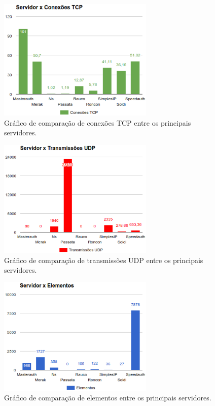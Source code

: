 \begin{figure}[h!]
 \centering
 \includegraphics[width=280px]{img/servico_tcp.eps}
 \caption{Gráfico de comparação de conexões TCP entre os principais servidores.}
 \label{fig:servico_tcp}
\end{figure}

\begin{figure}[h!]
 \centering
 \includegraphics[width=280px]{img/servico_udp.eps}
 \caption{Gráfico de comparação de transmissões UDP entre os principais servidores.}
 \label{fig:servico_udp}
\end{figure}

\begin{figure}[h!]
 \centering
 \includegraphics[width=280px]{img/servico_elemento.eps}
 \caption{Gráfico de comparação de elementos entre os principais servidores.}
 \label{fig:servico_elemento}
\end{figure}

